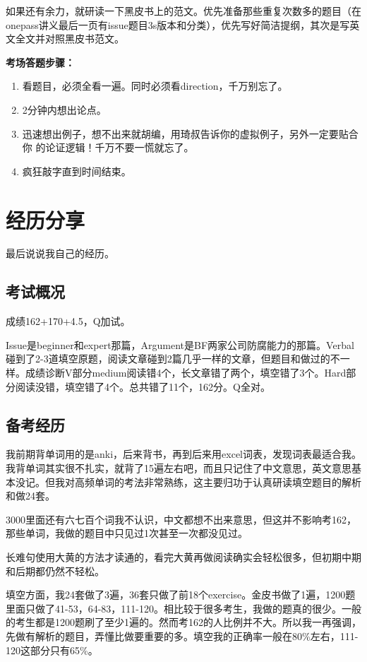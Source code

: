 \documentclass[cn,plain]{./src/qyxfbook}
\begin{document}
如果还有余力，就研读一下黑皮书上的范文。优先准备那些重复次数多的题目（在onepass讲义最后一页有issue题目3s版本和分类），优先写好简洁提纲，其次是写英文全文并对照黑皮书范文。

\textbf{考场答题步骤：}
\begin{enumerate}
\item 看题目，必须全看一遍。同时必须看direction，千万别忘了。
\item 2分钟内想出论点。
\item 迅速想出例子，想不出来就胡编，用琦叔告诉你的虚拟例子，另外一定要贴合你
的论证逻辑！千万不要一慌就忘了。
\item 疯狂敲字直到时间结束。
\end{enumerate}

\chapter{经历分享}
最后说说我自己的经历。

\section{考试概况}
成绩162+170+4.5，Q加试。

Issue是beginner和expert那篇，Argument是BF两家公司防腐能力的那篇。Verbal碰到了2-3道填空原题，阅读文章碰到2篇几乎一样的文章，但题目和做过的不一样。成绩诊断V部分medium阅读错4个，长文章错了两个，填空错了3个。Hard部分阅读没错，填空错了4个。总共错了11个，162分。Q全对。

\section{备考经历}
我前期背单词用的是anki，后来背书，再到后来用excel词表，发现词表最适合我。我背单词其实很不扎实，就背了15遍左右吧，而且只记住了中文意思，英文意思基本没记。但我对高频单词的考法非常熟练，这主要归功于认真研读填空题目的解析和做24套。

3000里面还有六七百个词我不认识，中文都想不出来意思，但这并不影响考162，那些单词，我做的题目中只见过1次甚至一次都没见过。

长难句使用大黄的方法才读通的，看完大黄再做阅读确实会轻松很多，但初期中期和后期都仍然不轻松。

填空方面，我24套做了3遍，36套只做了前18个exercise。金皮书做了1遍，1200题里面只做了41-53，64-83，111-120。相比较于很多考生，我做的题真的很少。一般的考生都是1200题刷了至少1遍的。然而考162的人比例并不大。所以我一再强调，先做有解析的题目，弄懂比做要重要的多。填空我的正确率一般在80\%左右，111-120这部分只有65\%。
\end{document}

